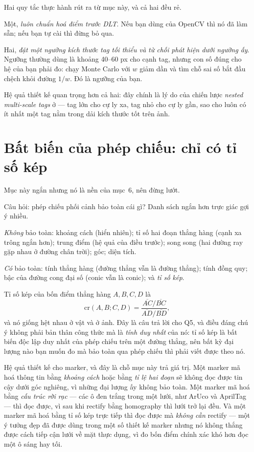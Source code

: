 \documentclass[../../marker.tex]{subfiles}
\begin{document}
\begin{cannho}
Hai quy tắc thực hành rút ra từ mục này, và cả hai đều rẻ.

Một, \emph{luôn chuẩn hoá điểm trước DLT}. Nếu bạn dùng  của OpenCV thì nó đã làm sẵn; nếu bạn tự cài thì đừng bỏ qua.

Hai, \emph{đặt một ngưỡng kích thước tag tối thiểu và từ chối phát hiện dưới ngưỡng ấy}. Ngưỡng thường dùng là khoảng 40--60 px cho cạnh tag, nhưng con số đúng cho hệ của bạn phải đo: chạy Monte Carlo với \(w\) giảm dần và tìm chỗ sai số bắt đầu chệch khỏi đường \(1/w\). Đó là ngưỡng của bạn.

Hệ quả thiết kế quan trọng hơn cả hai: đây chính là lý do của chiến lược \emph{nested multi-scale tags} ở  --- tag lớn cho cự ly xa, tag nhỏ cho cự ly gần, sao cho luôn có ít nhất một tag nằm trong dải kích thước tốt trên ảnh.
\end{cannho}

\section{Bất biến của phép chiếu: chỉ có tỉ số kép}

Mục này ngắn nhưng nó là nền của mục~6, nên đừng lướt.

Câu hỏi: phép chiếu phối cảnh bảo toàn cái gì? Danh sách ngắn hơn trực giác gợi ý nhiều.

\emph{Không} bảo toàn: khoảng cách (hiển nhiên); tỉ số hai đoạn thẳng hàng (cạnh xa trông ngắn hơn); trung điểm (hệ quả của điều trước); song song (hai đường ray gặp nhau ở đường chân trời); góc; diện tích.

\emph{Có} bảo toàn: tính thẳng hàng (đường thẳng vẫn là đường thẳng); tính đồng quy; bậc của đường cong đại số (conic vẫn là conic); và \emph{tỉ số kép}.

Tỉ số kép của bốn điểm thẳng hàng \(A, B, C, D\) là
\[
\mathrm{cr}(A,B;C,D) = \frac{\overline{AC}/\overline{BC}}{\overline{AD}/\overline{BD}},
\]
và nó giống hệt nhau ở vật và ở ảnh. Đây là câu trả lời cho Q5, và điều đáng chú ý không phải bản thân công thức mà là \emph{tính duy nhất} của nó: tỉ số kép là bất biến độc lập duy nhất của phép chiếu trên một đường thẳng, nên bất kỳ đại lượng nào bạn muốn đo mà bảo toàn qua phép chiếu thì phải viết được theo nó.

Hệ quả thiết kế cho marker, và đây là chỗ mục này trả giá trị. Một marker mã hoá thông tin bằng \emph{khoảng cách} hoặc bằng \emph{tỉ lệ hai đoạn} sẽ không đọc được tin cậy dưới góc nghiêng, vì những đại lượng ấy không bảo toàn. Một marker mã hoá bằng \emph{cấu trúc rời rạc} --- các ô đen trắng trong một lưới, như ArUco và AprilTag --- thì đọc được, vì sau khi rectify bằng homography thì lưới trở lại đều. Và một marker mã hoá bằng tỉ số kép trực tiếp thì đọc được mà \emph{không cần} rectify --- một ý tưởng đẹp đã được dùng trong một số thiết kế marker nhưng nó không thắng được cách tiếp cận lưới về mặt thực dụng, vì đo bốn điểm chính xác khó hơn đọc một ô sáng hay tối.
\end{document}
